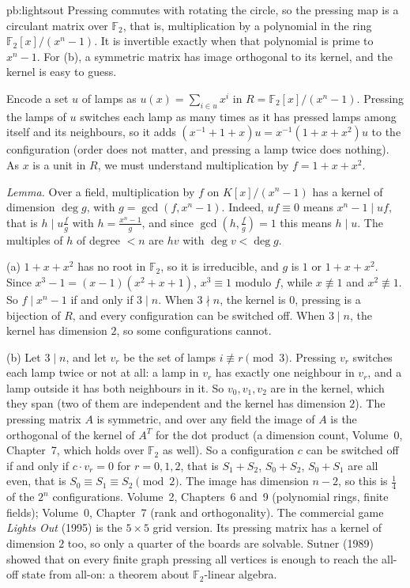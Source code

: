 \begin{solution}{pb:lightsout}
\idea Pressing commutes with rotating the circle, so the pressing map is a circulant matrix over $\mathbb F_2$, that is,
multiplication by a polynomial in the ring $\mathbb F_2[x]/(x^n-1)$. It is invertible exactly when that polynomial is prime
to $x^n-1$. For (b), a symmetric matrix has image orthogonal to its kernel, and the kernel is easy to guess.

\writeup Encode a set $u$ of lamps as $u(x)=\sum_{i\in u}x^i$ in $R=\mathbb F_2[x]/(x^n-1)$. Pressing the lamps of $u$
switches each lamp as many times as it has pressed lamps among itself and its neighbours, so it adds
$(x^{-1}+1+x)u=x^{-1}(1+x+x^2)u$ to the configuration (order does not matter, and pressing a lamp twice does nothing). As
$x$ is a unit in $R$, we must understand multiplication by $f=1+x+x^2$.

\emph{Lemma.} Over a field, multiplication by $f$ on $K[x]/(x^n-1)$ has a kernel of dimension $\deg g$, with
$g=\gcd(f,x^n-1)$. Indeed, $uf\equiv0$ means $x^n-1\mid uf$, that is $h\mid u\frac fg$ with $h=\frac{x^n-1}g$, and since
$\gcd(h,\frac fg)=1$ this means $h\mid u$. The multiples of $h$ of degree $<n$ are $hv$ with $\deg v<\deg g$.

(a) $1+x+x^2$ has no root in $\mathbb F_2$, so it is irreducible, and $g$ is $1$ or $1+x+x^2$. Since
$x^3-1=(x-1)(x^2+x+1)$, $x^3\equiv1$ modulo $f$, while $x\not\equiv1$ and $x^2\not\equiv1$. So $f\mid x^n-1$ if and only if
$3\mid n$. When $3\nmid n$, the kernel is $0$, pressing is a bijection of $R$, and every configuration can be switched off.
When $3\mid n$, the kernel has dimension $2$, so some configurations cannot.

(b) Let $3\mid n$, and let $v_r$ be the set of lamps $i\not\equiv r\pmod3$. Pressing $v_r$ switches each lamp twice or not at
all: a lamp in $v_r$ has exactly one neighbour in $v_r$, and a lamp outside it has both neighbours in it. So $v_0,v_1,v_2$
are in the kernel, which they span (two of them are independent and the kernel has dimension $2$). The pressing matrix
$A$ is symmetric, and over any field the image of $A$ is the orthogonal of the kernel of $A^T$ for the dot product (a
dimension count, Volume~0, Chapter~7, which holds over $\mathbb F_2$ as well). So a configuration $c$ can be switched off if
and only if $c\cdot v_r=0$ for $r=0,1,2$, that is $S_1+S_2$, $S_0+S_2$, $S_0+S_1$ are all even, that is $S_0\equiv S_1\equiv S_2
\pmod2$. The image has dimension $n-2$, so this is $\frac14$ of the $2^n$ configurations.
\tools Volume~2, Chapters~6 and~9 (polynomial rings, finite fields); Volume~0, Chapter~7 (rank and orthogonality).
\leads The commercial game \emph{Lights Out} (1995) is the $5\times5$ grid version. Its pressing matrix has a kernel of
dimension $2$ too, so only a quarter of the boards are solvable. Sutner (1989) showed that on every finite graph pressing
all vertices is enough to reach the all-off state from all-on: a theorem about $\mathbb F_2$-linear algebra.
\end{solution}

